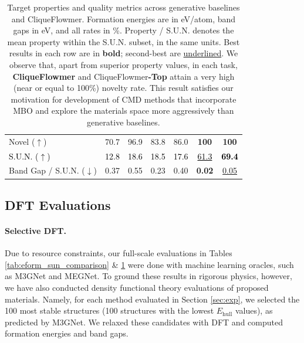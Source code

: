 \documentclass{article}
\theoremstyle{plain}
\theoremstyle{definition}
\theoremstyle{remark}
\begin{document}
\begin{table}[t]
{\begin{tabular}{l|cccc|cc}
        Novel ($\uparrow$)
        & 70.7
        & 96.9
        & 83.8
        & 86.0
        & \textbf{100}
        & \textbf{100} \\
        \textcolor{black}{S.U.N. ($\uparrow$)}  
        & \textcolor{black}{12.8}
        & \textcolor{black}{18.6}
        & \textcolor{black}{18.5}
        & \textcolor{black}{17.6}
        & \textcolor{black}{\underline{61.3}}
        & \textcolor{black}{\textbf{69.4}} \\
        Band Gap / S.U.N. ($\downarrow$) 
        & 0.37 
        & 0.55 
        & 0.23 
        & 0.40 
        & \textbf{0.02} 
        & \underline{0.05}\\
        \bottomrule
    \end{tabular}
    \caption{\small
    Target properties and quality metrics across generative baselines and CliqueFlowmer. Formation energies are in eV/atom, band gaps in eV, and all rates in \%. Property / S.U.N. denotes the mean property within the S.U.N. subset, in the same units.
    Best results in each row are in \textbf{bold}; second-best are \underline{underlined}.
    We observe that, apart from superior property values, in each task, 
    \textbf{CliqueFlowmer} and CliqueFlowmer\textbf{-Top} attain a very high (near or equal to 100\%) novelty rate. 
    This result satisfies our motivation for development of CMD methods that incorporate MBO and explore the materials space more aggressively than generative baselines.}
        \label{tab:all-metrics}
    }
\end{table}

\subsection{DFT Evaluations} 
\label{appendix:dft}
\paragraph{Selective DFT.} Due to resource constraints, our full-scale evaluations in Tables \ref{tab:eform_sun_comparison} \& \ref{tab:all-metrics} were done with machine learning oracles, such as M3GNet and MEGNet. 
To ground these results in rigorous physics, however, we have also conducted density functional theory \citep[DFT]{kohn1965self} evaluations of proposed materials. 
Namely, for each method evaluated in Section \ref{sec:exp}, we selected the 100 most stable structures (100 structures with the lowest $E_{\text{hull}}$ values), as predicted by M3GNet.
We relaxed these candidates with DFT and computed formation energies and band gaps.
\end{document}
